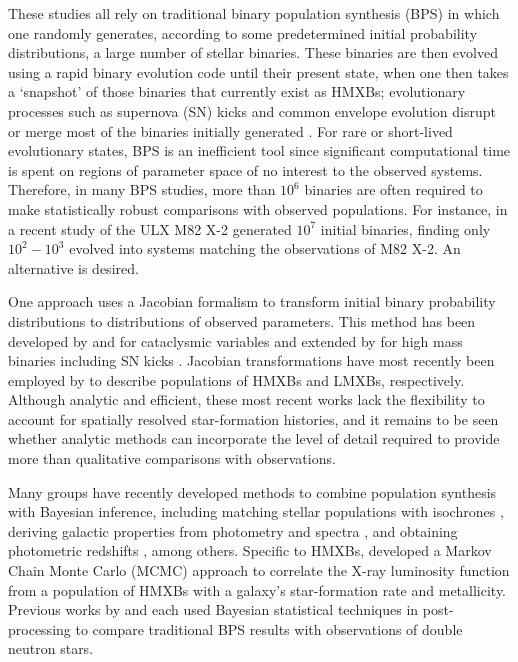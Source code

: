 \documentclass[usenatbib]{mnras}
\begin{document}
These studies all rely on traditional binary population synthesis (BPS) in which one randomly generates, according to some predetermined initial probability distributions, a large number of stellar binaries. These binaries are then evolved using a rapid binary evolution code until their present state, when one then takes a `snapshot' of those binaries that currently exist as HMXBs; evolutionary processes such as supernova (SN) kicks and common envelope evolution disrupt or merge most of the binaries initially generated \citep[For a recent discussion of state-of-the-art BPS codes and their differences, see;][]{toonen14}. For rare or short-lived evolutionary states, BPS is an inefficient tool since significant computational time is spent on regions of parameter space of no interest to the observed systems. Therefore, in many BPS studies, more than $10^6$ binaries are often required to make statistically robust comparisons with observed populations. For instance, in a recent study of the ULX M82 X-2 \citet{fragos15} generated $10^7$ initial binaries, finding only $10^2-10^3$ evolved into systems matching the observations of M82 X-2. An alternative is desired.


One approach uses a Jacobian formalism to transform initial binary probability distributions to distributions of observed parameters. This method has been developed by \citet{kolb93} and \citet{politano96} for cataclysmic variables and extended by \citet{kalogera96} for high mass binaries including SN kicks \citep[see also][]{kalogera98, kalogera00}. Jacobian transformations have most recently been employed by \citet{bhadkamkar12,bhadkamkar14} to describe populations of HMXBs and LMXBs, respectively. Although analytic and efficient, these most recent works lack the flexibility to account for spatially resolved star-formation histories, and it remains to be seen whether analytic methods can incorporate the level of detail required to provide more than qualitative comparisons with observations.


Many groups have recently developed methods to combine population synthesis with Bayesian inference, including matching stellar populations with isochrones \citep{stenning16}, deriving galactic properties from photometry and spectra \citep{krumholz15}, and obtaining photometric redshifts \citep{tanaka15}, among others. Specific to HMXBs, \citet{douna15} developed a Markov Chain Monte Carlo (MCMC) approach to correlate the X-ray luminosity function from a population of HMXBs with a galaxy's star-formation rate and metallicity. Previous works by \citet{ihm06} and \citet{andrews15} each used Bayesian statistical techniques in post-processing to compare traditional BPS results with observations of double neutron stars.
\end{document}
